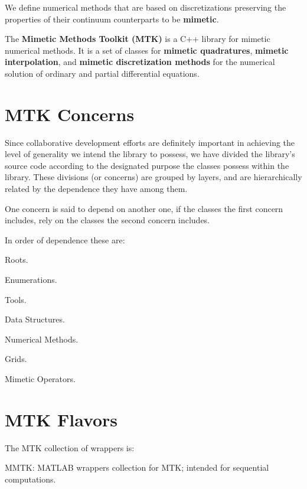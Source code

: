 We define numerical methods that are based on discretizations preserving the properties of their continuum counterparts to be {\bfseries mimetic}.

The {\bfseries Mimetic Methods Toolkit (M\-T\-K)} is a C++ library for mimetic numerical methods. It is a set of classes for {\bfseries mimetic quadratures}, {\bfseries mimetic interpolation}, and {\bfseries mimetic discretization methods} for the numerical solution of ordinary and partial differential equations.\hypertarget{index_section_mtk_concerns}{}\section{M\-T\-K Concerns}\label{index_section_mtk_concerns}
Since collaborative development efforts are definitely important in achieving the level of generality we intend the library to possess, we have divided the library's source code according to the designated purpose the classes possess within the library. These divisions (or concerns) are grouped by layers, and are hierarchically related by the dependence they have among them.

One concern is said to depend on another one, if the classes the first concern includes, rely on the classes the second concern includes.

In order of dependence these are\-:


\begin{DoxyEnumerate}
\item Roots.
\item Enumerations.
\item Tools.
\item Data Structures.
\item Numerical Methods.
\item Grids.
\item Mimetic Operators.
\end{DoxyEnumerate}\hypertarget{index_section_flavors}{}\section{M\-T\-K Flavors}\label{index_section_flavors}
The M\-T\-K collection of wrappers is\-:


\begin{DoxyEnumerate}
\item M\-M\-T\-K\-: M\-A\-T\-L\-A\-B wrappers collection for M\-T\-K; intended for sequential computations.
\end{DoxyEnumerate}

